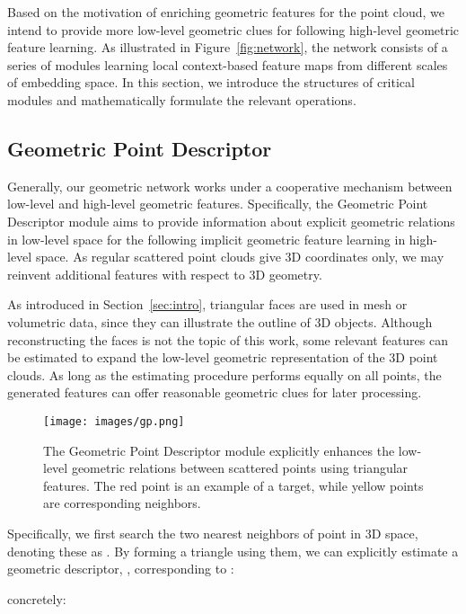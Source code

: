 \documentclass[journal,twoside]{IEEEtran}
\begin{document}
Based on the motivation of enriching geometric features for the point cloud, we intend to provide more low-level geometric clues for following high-level geometric feature learning. As illustrated in Figure~\ref{fig:network}, the network consists of a series of modules learning local context-based feature maps from different scales of embedding space. In this section, we introduce the structures of critical modules and mathematically formulate the relevant operations.

\subsection{Geometric Point Descriptor}
Generally, our geometric network works under a cooperative mechanism between low-level and high-level geometric features. Specifically, the Geometric Point Descriptor module aims to provide information about explicit geometric relations in low-level space for the following implicit geometric feature learning in high-level space. As regular scattered point clouds give 3D coordinates only, we may reinvent additional features with respect to 3D geometry.

As introduced in Section~\ref{sec:intro}, triangular faces are used in mesh or volumetric data, since they can illustrate the outline of 3D objects. Although reconstructing the faces is not the topic of this work, some relevant features can be estimated to expand the low-level geometric representation of the 3D point clouds. As long as the estimating procedure performs equally on all points, the generated features can offer reasonable geometric clues for later processing.

\begin{figure}
\begin{center}
\texttt{[image: images/gp.png]}
\end{center}
   \caption{The Geometric Point Descriptor module explicitly enhances the low-level geometric relations between scattered points using triangular features. The red point is an example of a target, while yellow points are corresponding neighbors.}
\label{fig:gp}
\end{figure}
Specifically, we first search the two nearest neighbors of point  in 3D space, denoting these as . By forming a triangle using them, we can explicitly estimate a geometric descriptor, , corresponding to :

concretely:
\begin{small}

\end{small}
\end{document}
